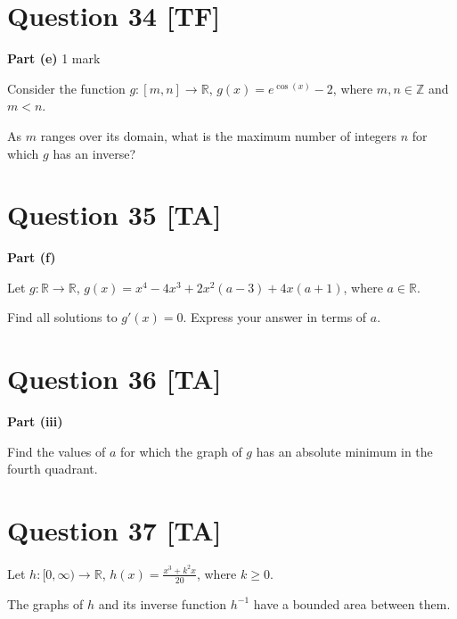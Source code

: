\documentclass[10pt,a4paper]{article}
\begin{document}
\vspace{9\baselineskip}

\hrulefill

\section*{Question 34 [TF]}

\textbf{Part (e)} \hfill 1 mark

Consider the function $g : [m,n] \to \mathbb{R}$, $g(x) = e^{\cos(x)} - 2$, where $m, n \in \mathbb{Z}$ and $m < n$.

As $m$ ranges over its domain, what is the maximum number of integers $n$ for which $g$ has an inverse?

\vspace{9\baselineskip}

\hrulefill

\section*{Question 35 [TA]}

\textbf{Part (f)}

Let $g : \mathbb{R} \to \mathbb{R}$, $g(x) = x^4 - 4x^3 + 2x^2(a-3) + 4x(a+1)$, where $a \in \mathbb{R}$.

Find all solutions to $g'(x) = 0$. Express your answer in terms of $a$.

\vspace{9\baselineskip}

\hrulefill

\section*{Question 36 [TA]}

\textbf{Part (iii)}

Find the values of $a$ for which the graph of $g$ has an absolute minimum in the fourth quadrant.

\vspace{9\baselineskip}

\hrulefill

\section*{Question 37 [TA]}

Let $h : [0,\infty) \to \mathbb{R}$, $h(x) = \frac{x^3 + k^2x}{20}$, where $k \geq 0$.

The graphs of $h$ and its inverse function $h^{-1}$ have a bounded area between them.
\end{document}
